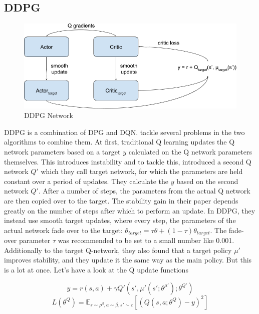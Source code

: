 \documentclass[hyperref,beleg]{cgvpub}
\begin{document}
\subsection{DDPG}

\begin{figure}
  \centering
  \includegraphics[width=0.6\linewidth]{images/DDPG_Setup.png}
  \caption{DDPG Network}
  \label{fig:ddpgsetup}
\end{figure}

\ac{DDPG} is a combination of \ac{DPG} and \ac{DQN}. \cite{lillicrapCONTINUOUSCONTROLDEEP2015} tackle several problems in the two algorithms to combine them. At first, traditional Q learning updates the Q network parameters based on a target $y$ calculated on the Q network parameters themselves. This introduces instability and to tackle this, \cite{mnihPlayingAtariDeep2013} introduced a second Q network $Q'$ which they call target network, for which the parameters are held constant over a period of updates. They calculate the $y$ based on the second network $Q'$. After a number of steps, the parameters from the actual Q network are then copied over to the target. The stability gain in their paper depends greatly on the number of steps after which to perform an update. In \ac{DDPG}, they instead use smooth target updates, where every step, the parameters of the actual network fade over to the target: $\theta_{target} = \tau \theta + (1 - \tau) \theta_{target}$. The fade-over parameter $\tau$ was recommended to be set to a small number like 0.001. Additionally to the target Q-network, they also found that a target policy $\mu'$ improves stability, and they update it the same way as the main policy. But this is a lot at once. Let's have a look at the Q update functions

\begin{equation}
y = r(s, a) + \gamma Q'(s', \mu'(s';\theta^{\mu'});\theta^{Q'})
\end{equation}
\begin{equation}
L(\theta^Q) = \mathbb{E}_{s \sim \rho^{\beta}, a \sim \beta, s' \sim \varepsilon}[(Q(s, a;\theta^Q) - y)^2]
\end{equation}
\end{document}

